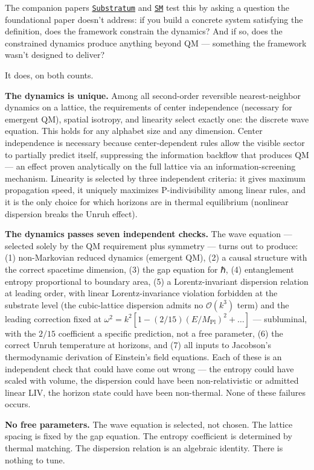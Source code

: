 \documentclass[
]{article}
\begin{document}
The companion papers \href{Substratum.md}{\texttt{Substratum}} and
\href{SM.md}{\texttt{SM}} test this by asking a question the
foundational paper doesn't address: if you build a concrete system
satisfying the definition, does the framework constrain the dynamics?
And if so, does the constrained dynamics produce anything beyond QM ---
something the framework wasn't designed to deliver?

It does, on both counts.

\textbf{The dynamics is unique.} Among all second-order reversible
nearest-neighbor dynamics on a lattice, the requirements of center
independence (necessary for emergent QM), spatial isotropy, and
linearity select exactly one: the discrete wave equation. This holds for
any alphabet size and any dimension. Center independence is necessary
because center-dependent rules allow the visible sector to partially
predict itself, suppressing the information backflow that produces QM
--- an effect proven analytically on the full lattice via an
information-screening mechanism. Linearity is selected by three
independent criteria: it gives maximum propagation speed, it uniquely
maximizes P-indivisibility among linear rules, and it is the only choice
for which horizons are in thermal equilibrium (nonlinear dispersion
breaks the Unruh effect).

\textbf{The dynamics passes seven independent checks.} The wave equation
--- selected solely by the QM requirement plus symmetry --- turns out to
produce: (1) non-Markovian reduced dynamics (emergent QM), (2) a causal
structure with the correct spacetime dimension, (3) the gap equation for
ℏ, (4) entanglement entropy proportional to boundary area, (5) a
Lorentz-invariant dispersion relation at leading order, with linear
Lorentz-invariance violation forbidden at the substrate level (the
cubic-lattice dispersion admits no \(\mathcal{O}(k^3)\) term) and the
leading correction fixed at
\(\omega^2 = k^2[1 - (2/15)(E/M_{\text{Pl}})^2 + \ldots]\) ---
subluminal, with the \(2/15\) coefficient a specific prediction, not a
free parameter, (6) the correct Unruh temperature at horizons, and (7)
all inputs to Jacobson's thermodynamic derivation of Einstein's field
equations. Each of these is an independent check that could have come
out wrong --- the entropy could have scaled with volume, the dispersion
could have been non-relativistic or admitted linear LIV, the horizon
state could have been non-thermal. None of these failures occurs.

\textbf{No free parameters.} The wave equation is selected, not chosen.
The lattice spacing is fixed by the gap equation. The entropy
coefficient is determined by thermal matching. The dispersion relation
is an algebraic identity. There is nothing to tune.
\end{document}
